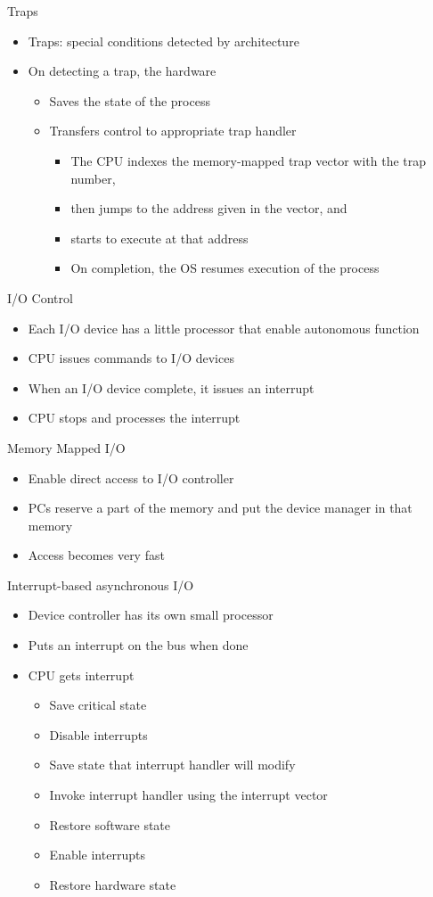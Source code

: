 \documentclass[12pt]{article}
\begin{document}
Traps
\begin{itemize}
    \item Traps: special conditions detected by architecture
    \item On detecting a trap, the hardware
    \begin{itemize}
        \item Saves the state of the process
        \item Transfers control to appropriate trap handler
        \begin{itemize}
            \item The CPU indexes the memory-mapped trap vector with the trap number,
            \item then jumps to the address given in the vector, and
            \item starts to execute at that address
            \item On completion, the OS resumes execution of the process
        \end{itemize}
    \end{itemize}
\end{itemize}

I/O Control
\begin{itemize}
    \item Each I/O device has a little processor that enable autonomous function
    \item CPU issues commands to I/O devices 
    \item When an I/O device complete, it issues an interrupt
    \item CPU stops and processes the interrupt
\end{itemize}

Memory Mapped I/O
\begin{itemize}
    \item Enable direct access to I/O controller
    \item PCs reserve a part of the memory and put the device manager in that memory
    \item Access becomes very fast
\end{itemize}

Interrupt-based asynchronous I/O
\begin{itemize}
    \item Device controller has its own small processor
    \item Puts an interrupt on the bus when done
    \item CPU gets interrupt
    \begin{itemize}
        \item Save critical state
        \item Disable interrupts
        \item Save state that interrupt handler will modify
        \item Invoke interrupt handler using the interrupt vector
        \item Restore software state
        \item Enable interrupts
        \item Restore hardware state
    \end{itemize}
\end{itemize}
\newpage
\end{document}
